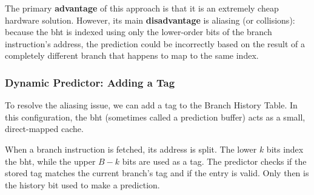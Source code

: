 The primary \textbf{advantage} of this approach is that it is an extremely cheap hardware solution. However, its main \textbf{disadvantage} is aliasing (or collisions): because the \gls{bht} is indexed using only the lower-order bits of the branch instruction's address, the prediction could be incorrectly based on the result of a completely different branch that happens to map to the same index.

\subsubsection{Dynamic Predictor: Adding a Tag}
To resolve the aliasing issue, we can add a tag to the Branch History Table. In this configuration, the \gls{bht} (sometimes called a prediction buffer) acts as a small, direct-mapped cache. 

When a branch instruction is fetched, its address is split. The lower \(k\) bits index the \gls{bht}, while the upper \(B-k\) bits are used as a tag. The predictor checks if the stored tag matches the current branch's tag and if the entry is valid. Only then is the history bit used to make a prediction.

